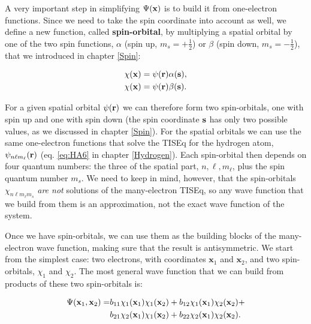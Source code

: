 \documentclass[
  english,
  9pt,
]{extbook}
\theoremstyle{definition}
\theoremstyle{definition}
\theoremstyle{definition}
\theoremstyle{definition}
\theoremstyle{remark}
\begin{document}
A very important step in simplifying \(\Psi({\bf x})\) is to build it from one-electron functions. Since we need to take the spin coordinate into account as well, we define a new function, called \textbf{spin-orbital}, by multiplying a spatial orbital by one of the two spin functions, \(\alpha\) (spin up, \(m_s=+\frac{1}{2}\)) or \(\beta\) (spin down, \(m_s=-\frac{1}{2}\)), that we introduced in chapter \ref{Spin}:

\begin{equation}
\begin{aligned}
\chi({\bf x}) &= \psi({\bf r}) \alpha({\bf s}), \\
\chi({\bf x}) &= \psi({\bf r}) \beta({\bf s}).
\end{aligned}
\label{eq:atom3}
\end{equation}

For a given spatial orbital \(\psi({\bf r})\) we can therefore form two spin-orbitals, one with spin up and one with spin down (the spin coordinate \({\bf s}\) has only two possible values, as we discussed in chapter \ref{Spin}). For the spatial orbitals we can use the same one-electron functions that solve the TISEq for the hydrogen atom, \(\psi_{n\ell m_{\ell}}({\bf r})\) (eq. \eqref{eq:HA6} in chapter \ref{Hydrogen}). Each spin-orbital then depends on four quantum numbers: the three of the spatial part, \(n,\ell,m_{\ell}\), plus the spin quantum number \(m_s\). We need to keep in mind, however, that the spin-orbitals \(\chi_{n\ell m_{\ell} m_{s}}\) \emph{are not} solutions of the many-electron TISEq, so any wave function that we build from them is an approximation, not the exact wave function of the system.

Once we have spin-orbitals, we can use them as the building blocks of the many-electron wave function, making sure that the result is antisymmetric. We start from the simplest case: two electrons, with coordinates \(\mathbf{x}_1\) and \(\mathbf{x}_2\), and two spin-orbitals, \(\chi_1\) and \(\chi_2\). The most general wave function that we can build from products of these two spin-orbitals is:

\begin{equation}
\begin{aligned}
\Psi({\bf x}_1, {\bf x}_2) =& b_{11} \chi_1({\bf x}_1) \chi_1({\bf x}_2) + b_{12} \chi_1({\bf x}_1) \chi_2({\bf x}_2) + \\
& b_{21} \chi_2({\bf x}_1) \chi_1({\bf x}_2) + b_{22} \chi_2({\bf x}_1) \chi_2({\bf x}_2).
\end{aligned}
\label{eq:atom4}
\end{equation}
\end{document}

